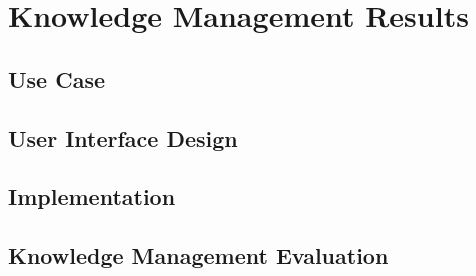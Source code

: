 \documentclass[12pt,oneside,openright,a4paper]{cpe-english-project}
\begin{document}
\section{Knowledge Management Results}
	\subsection{Use Case}
	\subsection{User Interface Design}
	\subsection{Implementation}
	\subsection{Knowledge Management Evaluation}
\end{document}
